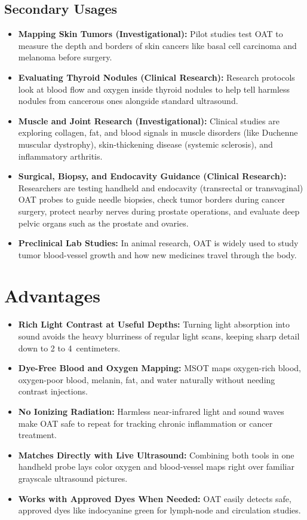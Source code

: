 \subsection{Secondary Usages}
\begin{itemize}
  \item \textbf{Mapping Skin Tumors (Investigational):} Pilot studies test OAT to measure the depth and borders of skin cancers like basal cell carcinoma and melanoma before surgery.
  \item \textbf{Evaluating Thyroid Nodules (Clinical Research):} Research protocols look at blood flow and oxygen inside thyroid nodules to help tell harmless nodules from cancerous ones alongside standard ultrasound.
  \item \textbf{Muscle and Joint Research (Investigational):} Clinical studies are exploring collagen, fat, and blood signals in muscle disorders (like Duchenne muscular dystrophy), skin-thickening disease (systemic sclerosis), and inflammatory arthritis.
  \item \textbf{Surgical, Biopsy, and Endocavity Guidance (Clinical Research):} Researchers are testing handheld and endocavity (transrectal or transvaginal) OAT probes to guide needle biopsies, check tumor borders during cancer surgery, protect nearby nerves during prostate operations, and evaluate deep pelvic organs such as the prostate and ovaries.
  \item \textbf{Preclinical Lab Studies:} In animal research, OAT is widely used to study tumor blood-vessel growth and how new medicines travel through the body.
\end{itemize}

\section{Advantages}
\begin{itemize}
  \item \textbf{Rich Light Contrast at Useful Depths:} Turning light absorption into sound avoids the heavy blurriness of regular light scans, keeping sharp detail down to 2 to 4~centimeters.
  \item \textbf{Dye-Free Blood and Oxygen Mapping:} MSOT maps oxygen-rich blood, oxygen-poor blood, melanin, fat, and water naturally without needing contrast injections.
  \item \textbf{No Ionizing Radiation:} Harmless near-infrared light and sound waves make OAT safe to repeat for tracking chronic inflammation or cancer treatment.
  \item \textbf{Matches Directly with Live Ultrasound:} Combining both tools in one handheld probe lays color oxygen and blood-vessel maps right over familiar grayscale ultrasound pictures.
  \item \textbf{Works with Approved Dyes When Needed:} OAT easily detects safe, approved dyes like indocyanine green for lymph-node and circulation studies.
\end{itemize}

